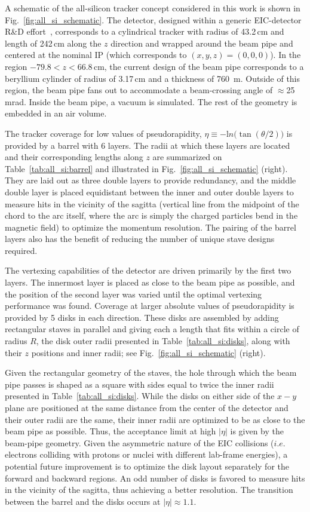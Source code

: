 A schematic of the all-silicon tracker concept considered in this work is shown in Fig.~\ref{fig:all_si_schematic}.
The detector, designed within a generic EIC-detector R\&D effort~\cite{eRD16},
corresponds to a cylindrical tracker with radius of 43.2\,cm and length of 242\,cm along the $z$ direction and wrapped around the beam pipe and centered at the nominal IP (which corresponds to $(x,y,z)=(0,0,0)$). In the region $-79.8 < z < 66.8$\,cm, the current design of the beam pipe corresponds to a beryllium cylinder of radius of 3.17\,cm and a thickness of 760~\textmu m. Outside of this region, the beam pipe fans out to accommodate a beam-crossing angle of $\approx$25\,mrad. Inside the beam pipe, a vacuum is simulated. The rest of the geometry is embedded in an air volume.

The tracker coverage for low values of pseudorapidity, $\eta\equiv-{\mathrm ln}\big(\tan(\theta/2)\big)$ is provided by a barrel with 6 layers. The radii at which these layers are located and their corresponding lengths along $z$ are summarized on Table~\ref{tab:all_si:barrel} and illustrated in Fig.~\ref{fig:all_si_schematic} (right). They are laid out as three double layers to provide redundancy, and the middle double layer is placed equidistant between the inner and outer double layers to measure hits in the vicinity of the sagitta (vertical line from the midpoint of the chord to the arc itself, where the arc is simply the charged particles bend in the magnetic field) to optimize the momentum resolution. The pairing of the barrel layers also has the benefit of reducing the number of unique stave designs required.

The vertexing capabilities of the detector are driven primarily by the
first two layers. The innermost layer is placed as close to the beam pipe as possible, and the position of the second layer was varied until the optimal vertexing performance was found. Coverage at larger absolute values of pseudorapidity is provided by 5 disks in each direction. These disks are assembled by adding rectangular staves in parallel and giving each a length that fits within a circle of radius $R$, the disk outer radii presented in Table~\ref{tab:all_si:disks}, along with their $z$ positions and inner radii; see Fig.~\ref{fig:all_si_schematic} (right).

Given the rectangular geometry of the staves, the hole through which the beam pipe passes is shaped as a square with sides equal to twice the inner radii presented in Table~\ref{tab:all_si:disks}.
While the disks on either side of the $x-y$ plane are positioned at the same distance from the center of the detector and their outer radii are the same, their inner radii are optimized to be as close to the beam pipe as possible. Thus, the acceptance limit at high $|\eta|$ is given by the beam-pipe geometry.
Given the asymmetric nature of the EIC collisions ($i.e.$ electrons colliding with protons or nuclei with different lab-frame energies), a potential future improvement is to optimize the disk layout separately for the forward and backward regions.
An odd number of disks is favored to measure hits in the vicinity of the sagitta, thus achieving a better resolution.
The transition between the barrel and the disks occurs at
$|\eta|\approx 1.1$.

